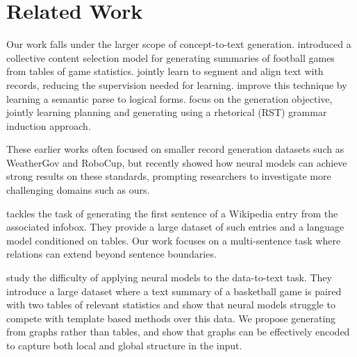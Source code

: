 \documentclass[11pt,a4paper]{article}
\begin{document}
\section{Related Work}





Our work falls under the larger scope of concept-to-text generation. 
\citet{barzilay2005collective} introduced a collective content selection model for generating summaries of football games from tables of game statistics. 
\citet{LiangJK:ACL09} jointly learn to segment and align text with records, reducing the supervision needed for learning. 
\citet{kim2010generative} improve this technique by learning a semantic parse to logical forms. 
\citet{konstas-lapata:2013:EMNLP} focus on the generation objective, jointly learning planning and generating using a rhetorical (RST) grammar induction approach. 

These earlier works often focused on smaller record generation datasets such as WeatherGov and RoboCup, but recently \citet{mei2016talk} showed how neural models can achieve strong results on these standards, prompting researchers to investigate more challenging domains such as ours.

\citet{lebret2016neural} tackles the task of generating the first sentence of a Wikipedia entry from the associated infobox. 
They provide a large dataset of such entries and a language model conditioned on tables.
Our work focuses on a multi-sentence task where relations can extend beyond sentence boundaries. 

\citet{wiseman2017challenges} study the difficulty of applying neural models to the data-to-text task. 
They introduce a large dataset where a text summary of a basketball game is paired with two tables of relevant statistics and show that neural models struggle to compete with template based methods over this data. 
We propose generating from graphs rather than tables, and show that graphs can be effectively encoded to capture both local and global structure in the input. 
\end{document}
